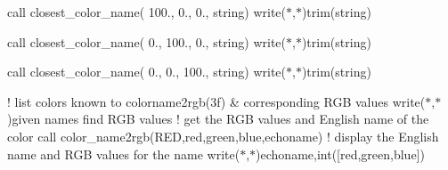 \begin{DoxyDescription}
call closest\+\_\+color\+\_\+name( 100., 0., 0., string) write($\ast$,$\ast$)trim(string)

call closest\+\_\+color\+\_\+name( 0., 100., 0., string) write($\ast$,$\ast$)trim(string)

call closest\+\_\+color\+\_\+name( 0., 0., 100., string) write($\ast$,$\ast$)trim(string)

! list colors known to colorname2rgb(3f) \& corresponding R\+GB values write($\ast$,$\ast$)\textquotesingle{}given names find R\+GB values\textquotesingle{} ! get the R\+GB values and English name of the color call color\+\_\+name2rgb(\textquotesingle{}R\+ED\textquotesingle{},red,green,blue,echoname) ! display the English name and R\+GB values for the name write($\ast$,$\ast$)echoname,int(\mbox{[}red,green,blue\mbox{]})


\end{DoxyDescription}
